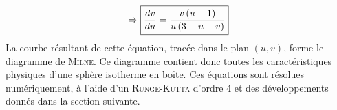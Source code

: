 \begin{equation}
	\Rightarrow \fbox{$
	\dfrac{d v}{d u} = \dfrac{v \left( u - 1\right)}{u \left(3 - u - v\right)}
	$} \label{eqdudv}
\end{equation}
La courbe résultant de cette équation, tracée dans le plan $\left(u, v\right)$, forme le diagramme
de \textsc{Milne}. Ce diagramme contient donc toutes les caractéristiques physiques d'une sphère isotherme
en boîte. Ces équations sont résolues numériquement, à l'aide d'un \textsc{Runge-Kutta} d'ordre 4 et des développements donnés dans la section suivante.

